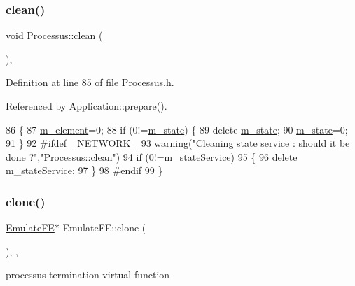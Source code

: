 \subsubsection{\texorpdfstring{clean()}{clean()}}
{\footnotesize\ttfamily void Processus\+::clean (\begin{DoxyParamCaption}{ }\end{DoxyParamCaption})\hspace{0.3cm}{\ttfamily [inline]}, {\ttfamily [inherited]}}



Definition at line 85 of file Processus.\+h.



Referenced by Application\+::prepare().


\begin{DoxyCode}
86   \{
87     \hyperlink{classProcessus_aa9d24d53c3e52f36786cabb5d8e296e7}{m\_element}=0;
88     \textcolor{keywordflow}{if} (0!=\hyperlink{classProcessus_ab3539eee42891ceae0baf4395ae7fb61}{m\_state}) \{
89       \textcolor{keyword}{delete} \hyperlink{classProcessus_ab3539eee42891ceae0baf4395ae7fb61}{m\_state};
90       \hyperlink{classProcessus_ab3539eee42891ceae0baf4395ae7fb61}{m\_state}=0;
91     \}
92 \textcolor{preprocessor}{#ifdef \_NETWORK\_
}
93     \hyperlink{classObject_a65cd4fda577711660821fd2cd5a3b4c9}{warning}(\textcolor{stringliteral}{"Cleaning state service : should it be done ?"},\textcolor{stringliteral}{"Processus::clean"})
94       if (0!=m\_stateService)
95       \{
96         \textcolor{keyword}{delete} m\_stateService;
97       \}
98 \textcolor{preprocessor}{#endif
}
99   \}
\end{DoxyCode}
\mbox{\label{classEmulateFE_a9a704d0081a275410d19071a006f1a80}} 
\subsubsection{\texorpdfstring{clone()}{clone()}}
{\footnotesize\ttfamily \hyperlink{classEmulateFE_1_1EmulateFE}{Emulate\+FE}$\ast$ Emulate\+F\+E\+::clone (\begin{DoxyParamCaption}{ }\end{DoxyParamCaption})\hspace{0.3cm}{\ttfamily [inline]}, {\ttfamily [protected]}, {\ttfamily [virtual]}}

processus termination virtual function 


